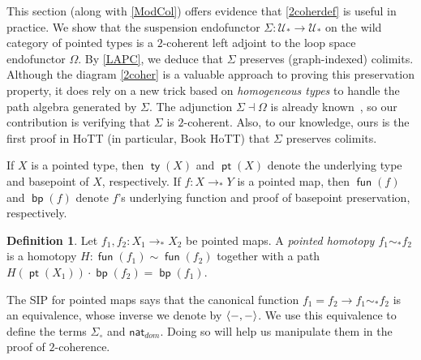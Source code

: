 \documentclass[10pt,a4paper]{article}
\theoremstyle{definition}
\newtheorem{defi}[thm]{Definition}
\theoremstyle{remark}
\newcommand{\U}{\mathcal{U}}
\newcommand{\dom}{\textit{dom}}
\newcommand{\nat}{\mathsf{nat}}
\newcommand{\0}{\mathbf{0}}
\newcommand{\1}{\mathbf{1}}
\newcommand{\2}{\mathbf{2}}
\DeclareMathOperator{\fun}{\mathsf{fun}}
\DeclareMathOperator{\bp}{\mathsf{bp}}
\DeclareMathOperator{\ty}{\mathsf{ty}}
\DeclareMathOperator{\pt}{\mathsf{pt}}
\begin{document}
This section (along with \autoref{ModCol}) offers evidence that \autoref{2coherdef} is useful in practice. We show that the suspension endofunctor $\Sigma : \U_{\ast} \to \U_{\ast}$ on the wild category of pointed types is a $2$-coherent left adjoint to the loop space endofunctor $\Omega$. By \autoref{LAPC}, we deduce that $\Sigma$ preserves (graph-indexed) colimits. Although the diagram \eqref{2coher} is a valuable approach to proving this preservation property, it does rely on a new trick based on \emph{homogeneous types} to handle the path algebra generated by $\Sigma$. The adjunction $\Sigma \dashv \Omega$ is already known~\cite[Lemma 2.16]{Hur}, so our contribution is verifying that $\Sigma$ is $2$-coherent. Also, to our knowledge, ours is the first proof in HoTT (in particular, Book HoTT) that $\Sigma$ preserves colimits.

If $X$ is a pointed type, then $\ty(X)$ and $\pt(X)$ denote the underlying type and basepoint of $X$, respectively. If $f : X \to_{\ast} Y$ is a pointed map, then $\fun(f)$ and $\bp(f)$ denote $f$'s underlying function and proof of basepoint preservation, respectively.
\begin{defi}
Let $f_1, f_2 : X_1 \to_{\ast} X_2$ be pointed maps. A \emph{pointed homotopy $f_1 \sim_{\ast} f_2$} is a homotopy $H : \fun(f_1) \sim \fun(f_2)$ together with a path $ H(\pt(X_1)) \cdot \bp(f_2) = \bp(f_1)$.
\end{defi}
The SIP for pointed maps says that the canonical function $f_1 = f_2 \to f_1 \sim_{\ast} f_2$ is an equivalence, whose  inverse we denote by $\mleft\langle{{-},{-}}\mright\rangle$. We use this equivalence to define the terms $\Sigma_{\circ}$ and $\nat_{\dom}$. Doing so will help us manipulate them in the proof of $2$-coherence. 
\end{document}
